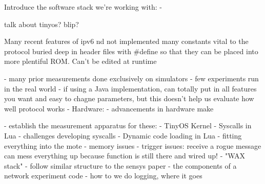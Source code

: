 Introduce the software stack we're working with:
-
\fi


talk about tinyos? blip?

Many recent features of  ipv6 nd not implemented
many constants vital to the protocol buried deep in header files with #define so that they
  can be placed into more plentiful ROM. Can't be edited at runtime
\fi

- many prior measurements done exclusively on simulators
    - few experiments run in the real world
    - if using a Java implementation, can totally put in all features you want and
      easy to chagne parameters, but this doesn't help us evaluate how well protocol works
- Hardware:
    - advancements in hardware make


- establish the measurement apparatus for these:
    - TinyOS Kernel
    - Syscalls in Lua
        - challenges developing syscalls
    - Dynamic code loading in Lua
    - fitting everything into the mote
        - memory issues
        -  trigger issues: receive a rogue message can mess everything up because function is still there and wired up!
    - "WAX stack"
        - follow similar structure to the sensys paper
        - the components of a network experiment code
        - how to we do logging, where it goes
\fi
